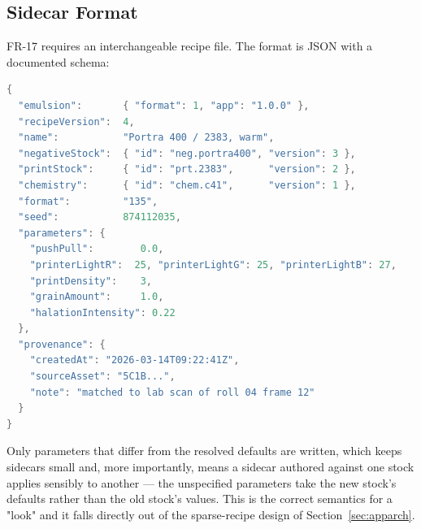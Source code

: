 \subsection{Sidecar Format}

FR-17 requires an interchangeable recipe file. The format is JSON with a
documented schema:

\begin{lstlisting}[language=Swift, caption={Sidecar structure (illustrative).}]
{
  "emulsion":       { "format": 1, "app": "1.0.0" },
  "recipeVersion":  4,
  "name":           "Portra 400 / 2383, warm",
  "negativeStock":  { "id": "neg.portra400", "version": 3 },
  "printStock":     { "id": "prt.2383",      "version": 2 },
  "chemistry":      { "id": "chem.c41",      "version": 1 },
  "format":         "135",
  "seed":           874112035,
  "parameters": {
    "pushPull":        0.0,
    "printerLightR":  25, "printerLightG": 25, "printerLightB": 27,
    "printDensity":    3,
    "grainAmount":     1.0,
    "halationIntensity": 0.22
  },
  "provenance": {
    "createdAt": "2026-03-14T09:22:41Z",
    "sourceAsset": "5C1B...",
    "note": "matched to lab scan of roll 04 frame 12"
  }
}
\end{lstlisting}

Only parameters that differ from the resolved defaults are written, which keeps
sidecars small and, more importantly, means a sidecar authored against one stock
applies sensibly to another --- the unspecified parameters take the new stock's
defaults rather than the old stock's values. This is the correct semantics for a
"look" and it falls directly out of the sparse-recipe design of
Section~\ref{sec:apparch}.
